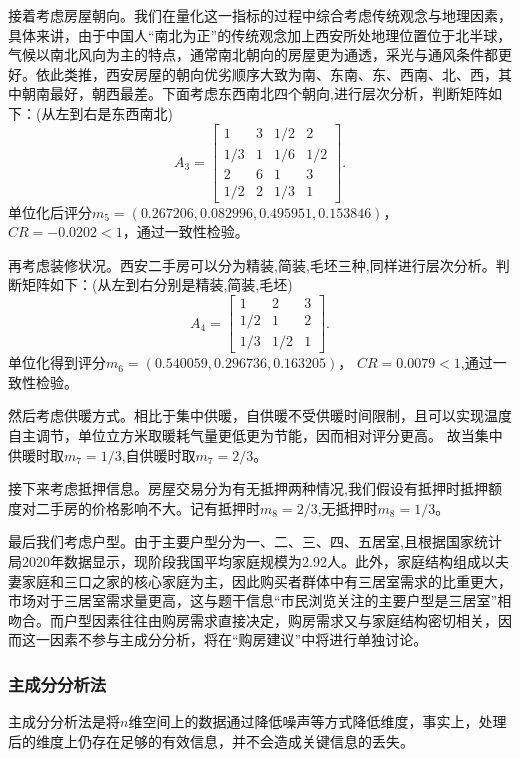 \documentclass[withoutpreface,bwprint]{cumcmthesis} %
\begin{document}
接着考虑房屋朝向。我们在量化这一指标的过程中综合考虑传统观念与地理因素，具体来讲，由于中国人“南北为正”的传统观念加上西安所处地理位置位于北半球，气候以南北风向为主的特点，通常南北朝向的房屋更为通透，采光与通风条件都更好。依此类推，西安房屋的朝向优劣顺序大致为南、东南、东、西南、北、西，其中朝南最好，朝西最差。下面考虑东西南北四个朝向,进行层次分析，判断矩阵如下：(从左到右是东西南北)
\begin{equation}
    A_3=\begin{bmatrix}
        1 & 3 & 1/2 & 2\\
        1/3 & 1 & 1/6 & 1/2\\
        2 & 6 & 1 & 3\\
        1/2 & 2 & 1/3 & 1
    \end{bmatrix}.
\end{equation}
单位化后评分$m_5=(0.267206,0.082996,0.495951,0.153846)$，
$CR=-0.0202<1$，通过一致性检验。

再考虑装修状况。西安二手房可以分为精装,简装,毛坯三种,同样进行层次分析。判断矩阵如下：(从左到右分别是精装,简装,毛坯)
\begin{equation}
    A_4=\begin{bmatrix}
    1 & 2 &3\\
    1/2 & 1 & 2\\
    1/3 & 1/2 & 1
    \end{bmatrix}.
\end{equation}
单位化得到评分$m_6=(0.540059,0.296736,0.163205)$，
$CR=0.0079<1$,通过一致性检验。

然后考虑供暖方式。相比于集中供暖，自供暖不受供暖时间限制，且可以实现温度自主调节，单位立方米取暖耗气量更低更为节能，因而相对评分更高。
故当集中供暖时取$m_7=1/3$,自供暖时取$m_7=2/3$。

接下来考虑抵押信息。房屋交易分为有无抵押两种情况,我们假设有抵押时抵押额度对二手房的价格影响不大。记有抵押时$m_8=2/3$,无抵押时$m_8=1/3$。

最后我们考虑户型。由于主要户型分为一、二、三、四、五居室,且根据国家统计局2020年数据显示，现阶段我国平均家庭规模为2.92人。此外，家庭结构组成以夫妻家庭和三口之家的核心家庭为主，因此购买者群体中有三居室需求的比重更大，市场对于三居室需求量更高，这与题干信息“市民浏览关注的主要户型是三居室”相吻合。而户型因素往往由购房需求直接决定，购房需求又与家庭结构密切相关，因而这一因素不参与主成分分析，将在“购房建议”中将进行单独讨论。


\subsubsection{主成分分析法}
主成分分析法是将$n$维空间上的数据通过降低噪声等方式降低维度，事实上，处理后的维度上仍存在足够的有效信息，并不会造成关键信息的丢失。
\end{document}
